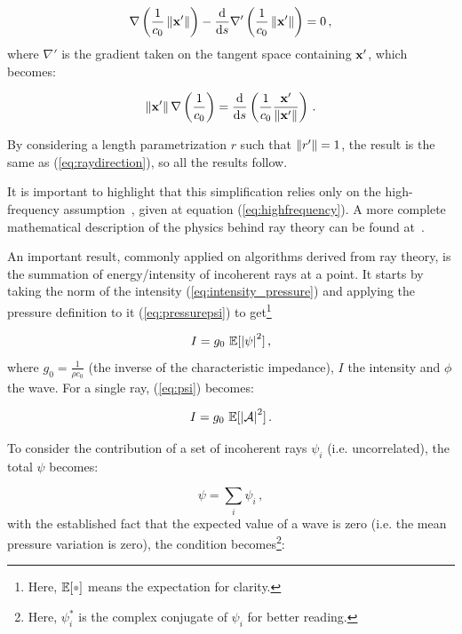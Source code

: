 \begin{equation*}
\nabla\left(\frac{1}{c_0}\left\lVert\mathrm{\mathbf{x}}'\right\rVert\right) - \frac{\mathrm{d}}{\mathrm{d} s}
\nabla'\left(\frac{1}{c_0} \left\lVert\mathrm{\mathbf{x}}'\right\rVert\right) = 0\,,
\end{equation*}
%
where $\nabla'$ is the gradient taken on the tangent space containing
$\mathrm{\mathbf{x}}'$, which becomes:

\begin{equation*}
\left\lVert\mathrm{\mathbf{x}}'\right\rVert\nabla\left(\frac{1}{c_0}\right) =
\frac{\mathrm{d}}{\mathrm{d} s}\left( \frac{1}{c_0}
\frac{\mathrm{\mathbf{x}}'}{\left\lVert\mathrm{\mathbf{x}}'\right\rVert}\right)\,.
\end{equation*}

By considering a length parametrization $r$ such that $\left\lVert r'\right\rVert=1$, the
result is the same as (\ref{eq:raydirection}), so all the results follow.

It is important to highlight that this simplification relies only on the
high-frequency assumption~\cite{national1969physics}, given at equation
(\ref{eq:highfrequency}). A more complete mathematical description of the physics
behind ray theory can be found at~\citet{Lefebvre}.

An important result, commonly applied on algorithms derived from ray theory, is
the summation of energy/intensity of incoherent rays at a point. It starts by
taking the norm of the intensity (\ref{eq:intensity_pressure}) and applying the
pressure definition to it (\ref{eq:pressurepsi}) to get\footnote{Here,
$\mathbb{E}[\parm]$ means the expectation for clarity.}


\begin{equation}\label{eq:intensity_psi}
I = g_0~\mathbb{E}[\left|\psi\right|^2]\,,
\end{equation}
%
where $g_0 = \tfrac{1}{\rho c_0}$ (the inverse of the characteristic impedance),
$I$ the intensity and $\phi$ the wave.
For a single ray, (\ref{eq:psi}) becomes:

\begin{equation*}
I = g_0~\mathbb{E}[\left|\mathcal{A}\right|^2]\,.
\end{equation*}

To consider the contribution of a set of incoherent rays $\psi_i$ (i.e.
uncorrelated), the total $\psi$ becomes:

\begin{equation}\label{eq:wavesum}
\psi = \sum_i \psi_i \,,
\end{equation}
%
with the established fact that the expected value of a wave is zero (i.e. the
mean pressure variation is zero), the condition
becomes\footnote{Here, $\psi_i^*$ is the complex conjugate of $\psi_i$ for
better reading.}:


